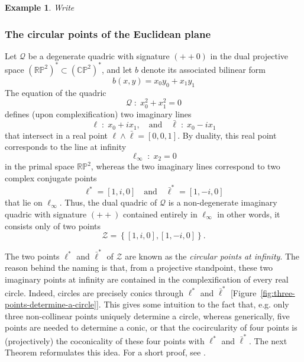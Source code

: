 \documentclass[10pt, a4paper]{article}
\theoremstyle{BoldTopSpacing}
\theoremstyle{BoldTopSpacing}
\theoremstyle{BoldTopSpacing}
\theoremstyle{BoldTopBottomSpacing}
\theoremstyle{BoldTopSpacing}
\theoremstyle{BoldTopBottomSpacing}
\newtheorem{example}{Example}[section]
\theoremstyle{remark}
\begin{document}
\begin{example}
\label{ex:hyperbolic-geometry}
Write
\end{example}

\subsubsection{The circular points of the Euclidean plane}
\label{subsubsec:circular-points-two-dimensional}

Let $\mathcal{Q}$ be a degenerate quadric with signature $(+ + 0)$ in the dual projective space $(\mathbb{R}\mathbb{P}^{2})^{*} \subset (\mathbb{C}\mathbb{P}^{2})^{*}$, and let $b$ denote its associated bilinear form
\[
    b(x, y) = x_{0}y_{0} + x_{1}y_{1}
\]
The equation of the quadric
\begin{equation*}
    \mathcal{Q} \; : \; x_{0}^2 + x_{1}^2 = 0
\end{equation*}
defines (upon complexification) two imaginary lines
\[
    \ell \; : \; x_{0} + i x_{1}, \quad \text{and} \quad \bar{\ell} \; : \; x_{0} - i x_{1}
\]
that intersect in a real point $\ell \wedge \bar{\ell} = [0, 0, 1]$. By duality, this real point corresponds to the line at infinity
\[
    \ell_{\infty} \; : \; x_{2} = 0
\]
in the primal space $\mathbb{R}\mathbb{P}^2$, whereas the two imaginary lines correspond to two complex conjugate points
\[
    \ell^{*} = [1, i, 0] \quad \text{and} \quad \bar{\ell}^{*} = [1, -i, 0]
\]
that lie on $\ell_{\infty}$. Thus, the dual quadric of $\mathcal{Q}$ is a non-degenerate imaginary quadric with signature $(+ +)$ contained entirely in $\ell_{\infty}$ \textemdash in other words, it consists only of two points
\begin{equation*}
    \mathcal{Z} = \left\{ [1, i, 0], [1, -i, 0] \right\}.
\end{equation*}

The two points $\ell^{*}$ and $\bar{\ell}^{*}$ of $\mathcal{Z}$ are known as the \textit{circular points at infinity}. The reason behind the naming is that, from a projective standpoint, these two imaginary points at infinity are contained in the complexification of every real circle. Indeed, circles are precisely conics through $\ell^{*}$ and $\bar{\ell}^{*}$ [Figure~\ref{fig:three-points-determine-a-circle}]. This gives some intuition to the fact that, e.g. only three non-collinear points uniquely determine a circle, whereas generically, five points are needed to determine a conic, or that the cocircularity of four points is (projectively) the coconicality of these four points with $\ell^{*}$ and $\bar{\ell}^{*}$. The next Theorem reformulates this idea. For a short proof, see \cite[\textcolor{CitationColor}{Proposition~9.9}]{geometryII}. \par
\end{document}
